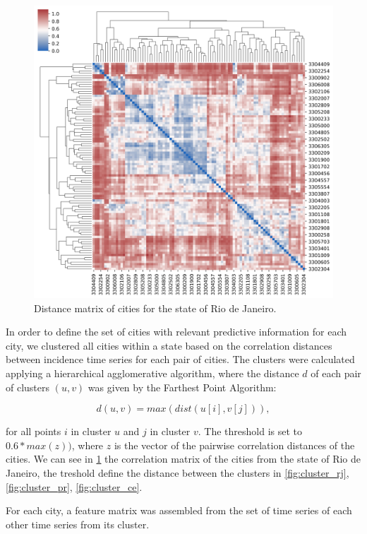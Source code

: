 \documentclass[12pt]{report}
\begin{document}
\begin{figure}[h!]
 \centering
 \includegraphics[scale=0.4]{cluster_corr_RJ.png}
 \caption{Distance matrix of cities for the state of Rio de Janeiro.}
 \label{fig:corr_rj}
\end{figure}

In order to define the set of cities with relevant predictive information for each city, we clustered all cities within a state based on the correlation distances between incidence time series for each pair of cities. The clusters were calculated applying a  hierarchical agglomerative algorithm, where the distance $d$ of each pair of clusters $(u,v)$ was given by the Farthest Point Algorithm:

$$d(u,v) = max(dist(u[i],v[j])), $$

for all points $i$ in cluster $u$ and $j$ in cluster $v$. The threshold is set to $0.6*max(z))$, where $z$ is the vector of the pairwise correlation distances of the cities. We can see in  \ref{fig:corr_rj} the correlation matrix of the cities from the state of Rio de Janeiro, the treshold define the distance between the clusters in \ref{fig:cluster_rj}, \ref{fig:cluster_pr}, \ref{fig:cluster_ce}.

For each city, a feature matrix was assembled from the set of time series of each other time series from its cluster.
\end{document}
